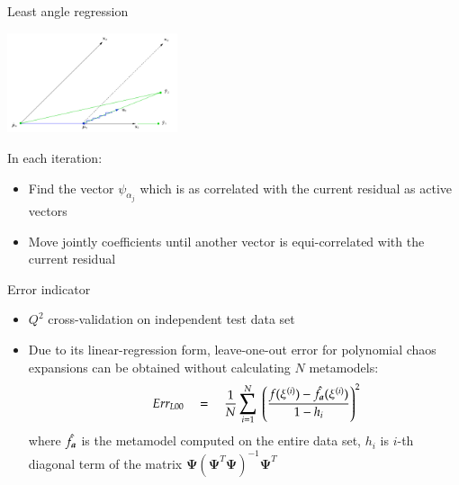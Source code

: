 \documentclass[9pt]{beamer}
\begin{document}
\begin{frame}{Least angle regression}

\begin{center}
 \includegraphics[width=5cm]{../Pics/lars.png} \\
 \color{cornellred}{Least angle regression}
\end{center}

In each iteration:
\begin{itemize}
	\item Find the vector $\psi_{\alpha_j}$ which is as correlated with the current residual as active vectors
	\item Move jointly coefficients until another vector is equi-correlated with the current residual
\end{itemize}

\end{frame}



\begin{frame}[t]{Error indicator}
\begin{itemize}
\item $Q^2$ cross-validation on independent test data set
\item Due to its linear-regression form, leave-one-out error for polynomial chaos expansions can be obtained without calculating $N$ metamodels:
$$  \qquad Err_{L00} \quad = \quad \frac{1}{N} \sum_{i=1}^{N} \; \left( \frac{ f(\xi^{(i)}) - \hat{f}_{\boldsymbol a}(\xi^{(i)}) } {1 - h_i} \right)^2  $$ 
where $\hat{f}_{\boldsymbol a}$ is the metamodel computed on the entire data set, $h_i$ is $i$-th diagonal term of the matrix $\boldsymbol{\Psi} \left( \boldsymbol{\Psi}^T \boldsymbol{\Psi} \right)^{-1} \boldsymbol{\Psi}^T$

\end{itemize}





\end{frame}
\end{document}
